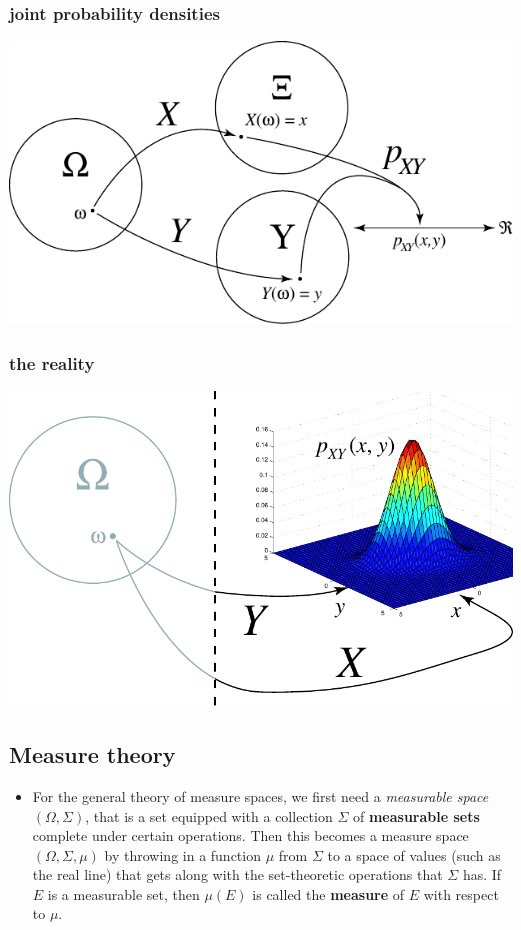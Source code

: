 \begin{frame}
\frametitle{joint probability densities}
\begin{center}	
			\includegraphics[scale=0.45]{fig/probjointdens18.pdf}
	\end{center}		
\end{frame}

\begin{frame}
\frametitle{the reality}
\begin{center}	
			\includegraphics[scale=0.45]{fig/probreality19.pdf}
	\end{center}		
\end{frame}

\subsection{Measure theory}
\begin{frame}
\begin{itemize}
\item For the general theory of measure spaces, we first need a \emph{measurable space} $(\Omega, \Sigma)$, that is a set equipped with a collection $\Sigma$ of \textbf{measurable sets} complete under certain operations. Then this becomes a measure space $(\Omega, \Sigma, \mu)$ by throwing in a function $\mu$ from $\Sigma$ to a space of values (such as the real line) that gets along with the set-theoretic operations that $\Sigma$ has. If $E$ is a measurable set, then $\mu(E)$ is called the \textbf{measure} of $E$ with respect to $\mu$. \cite{Insua2012, NLab}
\end{itemize}
\end{frame}

